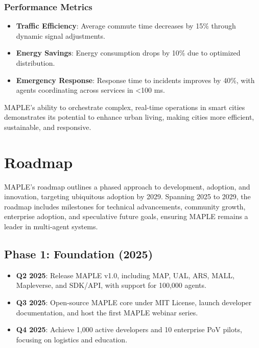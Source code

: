 \documentclass[a4paper,11pt]{article}
\begin{document}
\subsubsection{Performance Metrics}
\begin{itemize}[leftmargin=*]
    \item \textbf{Traffic Efficiency}: Average commute time decreases by 15\% through dynamic signal adjustments.
    \item \textbf{Energy Savings}: Energy consumption drops by 10\% due to optimized distribution.
    \item \textbf{Emergency Response}: Response time to incidents improves by 40\%, with agents coordinating across services in <100 ms.
\end{itemize}

MAPLE’s ability to orchestrate complex, real-time operations in smart cities demonstrates its potential to enhance urban living, making cities more efficient, sustainable, and responsive.

\pagebreak

\section{Roadmap}
MAPLE’s roadmap outlines a phased approach to development, adoption, and innovation, targeting ubiquitous adoption by 2029. Spanning 2025 to 2029, the roadmap includes milestones for technical advancements, community growth, enterprise adoption, and speculative future goals, ensuring MAPLE remains a leader in multi-agent systems.

\subsection{Phase 1: Foundation (2025)}
\begin{itemize}[leftmargin=*]
    \item \textbf{Q2 2025}: Release MAPLE v1.0, including MAP, UAL, ARS, MALL, Mapleverse, and SDK/API, with support for 100,000 agents.
    \item \textbf{Q3 2025}: Open-source MAPLE core under MIT License, launch developer documentation, and host the first MAPLE webinar series.
    \item \textbf{Q4 2025}: Achieve 1,000 active developers and 10 enterprise PoV pilots, focusing on logistics and education.
\end{itemize}
\end{document}
